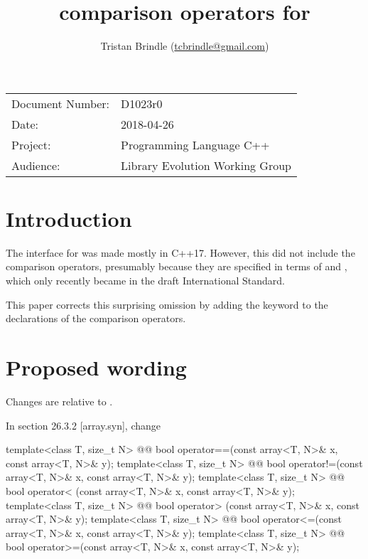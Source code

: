 


\title{ comparison operators for }
\author{
Tristan Brindle \small(\href{mailto:tcbrindle@gmail.com}{tcbrindle@gmail.com})
}
\date{} %
\maketitle

\begin{tabular}{ll}
Document Number: & D1023r0 \\
Date: &2018-04-26 \\
Project: & Programming Language C++ \\
Audience: & Library Evolution Working Group
\end{tabular}


\section{Introduction}
\label{sec:intro}

The interface for  was made mostly  in C++17. However, this did not include the comparison operators,
presumably because they are specified in terms of  and ,
which only recently became  in the draft International Standard.

This paper corrects this surprising omission by adding the  keyword to the declarations of the 
comparison operators.

\section{Proposed wording}
\label{sec:solution}

Changes are relative to \cite{N4741}.

In section 26.3.2 [array.syn], change

\begin{codeblock}
template<class T, size_t N>
  @@ bool operator==(const array<T, N>& x, const array<T, N>& y);
template<class T, size_t N>
  @@ bool operator!=(const array<T, N>& x, const array<T, N>& y);
template<class T, size_t N>
  @@ bool operator< (const array<T, N>& x, const array<T, N>& y);
template<class T, size_t N>
  @@ bool operator> (const array<T, N>& x, const array<T, N>& y);
template<class T, size_t N>
  @@ bool operator<=(const array<T, N>& x, const array<T, N>& y);
template<class T, size_t N>
  @@ bool operator>=(const array<T, N>& x, const array<T, N>& y);
\end{codeblock}

\renewcommand{\bibname}{References}



